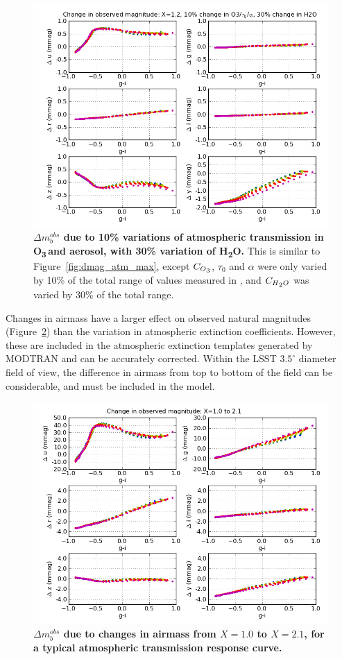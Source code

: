 \documentclass[12pt,preprint]{aastex}
\newcommand{\water}   {H\textsubscript{2}O}
\newcommand{\ozone}    {O\textsubscript{3}}
\begin{document}
\begin{figure}
\centering
\includegraphics[width=6in]{delta_mags_10}
\caption{{\small
{\bf $\Delta m_b^{obs}$ due to 10\% variations of 
atmospheric transmission in \ozone\,and aerosol, with 30\% variation of \water.} 
This is similar to Figure~\ref{fig:dmag_atm_max}, except $C_{\ozone}$,
$\tau_0$ and $\alpha$ were only varied by 10\% of the total range of
values measured in \citet{Burke2010b}, and $C_{\water}$ was varied by 30\%
of the total range. }}
\label{fig:dmag_atm_10}
\end{figure}

Changes in airmass have a larger effect on observed natural magnitudes
(Figure~\ref{fig:dmag_airmass}) than the variation in atmospheric
extinction coefficients. However, these are included in the atmospheric extinction
templates generated by MODTRAN and can be accurately corrected.
Within the LSST $3.5^\circ$ diameter field of view, the difference in
airmass from top to bottom of the field can be considerable, and must
be included in the model. 

\begin{figure}
\centering
\includegraphics[width=6in]{delta_mags_airmass_big}
\caption{{\small
{\bf $\Delta m_b^{obs}$ due to changes in airmass from $X=1.0$ 
to $X=2.1$, for a typical atmospheric transmission response curve.}
}}
\label{fig:dmag_airmass}
\end{figure}
\end{document}
